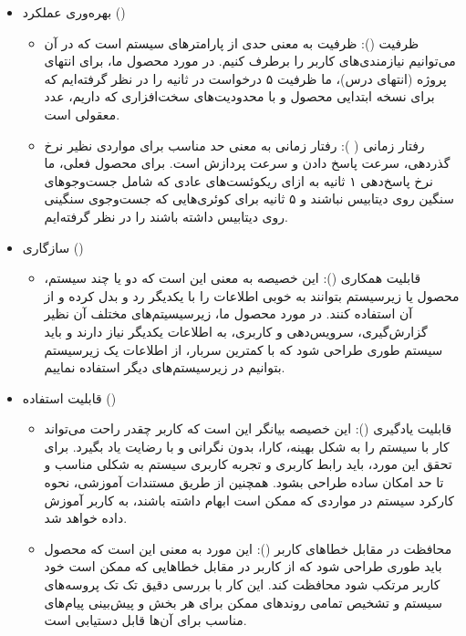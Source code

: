 \begin{itemize}
	\item 
	بهره‌وری عملکرد ()
	
	\begin{itemize}
		\item
		ظرفیت (): ظرفیت به معنی حدی از پارامترهای سیستم است که در آن می‌توانیم نیازمندی‌های کاربر را برطرف کنیم. در مورد محصول ما، برای انتهای پروژه (انتهای درس)، ما ظرفیت ۵ درخواست در ثانیه را در نظر گرفته‌ایم که برای نسخه ابتدایی محصول و با محدودیت‌های سخت‌افزاری که داریم، عدد معقولی است.
		
		\item 
		رفتار زمانی ( ): رفتار زمانی به معنی حد مناسب برای مواردی نظیر نرخ گذردهی، سرعت پاسخ دادن و سرعت پردازش است. برای محصول فعلی، ما نرخ پاسخ‌دهی ۱ ثانیه به ازای ریکوئست‌های عادی که شامل جست‌وجو‌های سنگین روی دیتابیس نباشند و ۵ ثانیه برای کوئری‌هایی که جست‌وجوی سنگینی روی دیتابیس داشته باشند را در نظر گرفته‌ایم.
		
	\end{itemize}

	\item
	سازگاری ()
	\begin{itemize}
		\item
		قابلیت همکاری (): این خصیصه به معنی این است که دو یا چند سیستم، محصول یا زیر‌سیستم بتوانند به خوبی اطلاعات را با یکدیگر رد و بدل کرده و از آن استفاده کنند. در مورد محصول ما، زیرسیسیتم‌های مختلف آن نظیر گزارش‌گیری، سرویس‌دهی و کاربری، به اطلاعات یکدیگر نیاز دارند و باید سیستم طوری طراحی شود که با کمترین سربار، از اطلاعات یک زیرسیستم بتوانیم در زیرسیستم‌های دیگر استفاده نماییم.
		
	\end{itemize}

\item
قابلیت استفاده ()

\begin{itemize}

\item 
قابلیت یادگیری (): این خصیصه بیانگر این است که کاربر چقدر راحت می‌تواند کار با سیستم را به شکل بهینه، کارا، بدون نگرانی و با رضایت یاد بگیرد. برای تحقق این مورد، باید رابط کاربری و تجربه کاربری سیستم به شکلی مناسب و تا حد امکان ساده طراحی بشود. همچنین از طریق مستندات آموزشی، نحوه کارکرد سیستم در مواردی که ممکن است ابهام داشته باشند، به کاربر آموزش داده خواهد شد.

\item
محافظت در مقابل خطاهای کاربر (): این مورد به معنی این است که محصول باید طوری طراحی شود که از کاربر در مقابل خطاهایی که ممکن است خود کاربر مرتکب شود محافظت کند. این کار با بررسی دقیق تک تک پروسه‌های سیستم و تشخیص تمامی روندهای ممکن برای هر بخش و پیش‌بینی پیام‌های مناسب برای آن‌ها قابل دستیابی است.


\end{itemize}
\end{itemize}
